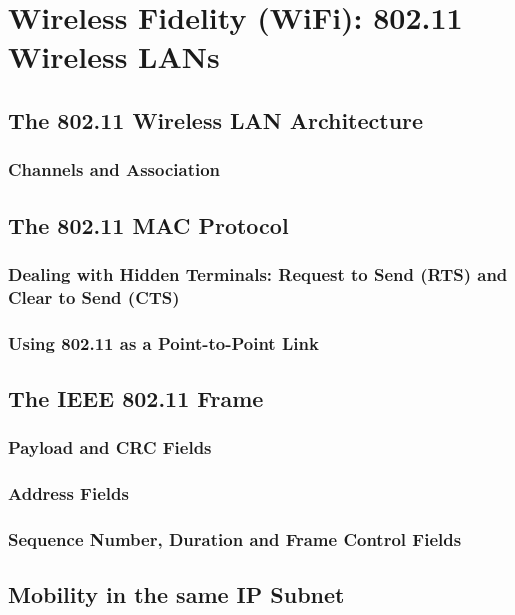 \documentclass[12pt letter]{report}
\begin{document}
\chapter{Wireless Fidelity (WiFi): 802.11 Wireless LANs}

\section{The 802.11 Wireless LAN Architecture}

\subsection{Channels and Association}

\section{The 802.11 MAC Protocol}

\subsection{Dealing with Hidden Terminals: Request to Send (RTS) and
Clear to Send (CTS)}

\subsection{Using 802.11 as a Point-to-Point Link}

\section{The IEEE 802.11 Frame}

\subsection{Payload and CRC Fields}

\subsection{Address Fields}

\subsection{Sequence Number, Duration and Frame Control Fields}

\section{Mobility in the same IP Subnet}
\end{document}
